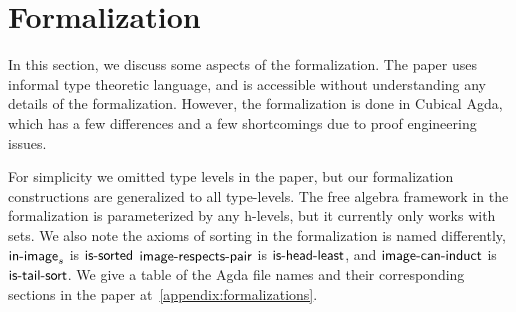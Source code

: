 \section{Formalization}
\label{sec:formalization}

In this section, we discuss some aspects of the formalization.
The paper uses informal type theoretic language,
and is accessible without understanding any details of the formalization.
However, the formalization is done in Cubical Agda, which has a few differences and a few
shortcomings due to proof engineering issues.

For simplicity we omitted type levels in the paper, but our formalization constructions
are generalized to all type-levels.
The free algebra framework in the formalization is
parameterized by any h-levels, but it currently only works with sets.
We also note the axioms of sorting in the formalization is named differently,
$\operatorname{\mathsf{in-image}}_s$ is $\operatorname{\mathsf{is-sorted}}$
$\operatorname{\mathsf{image-respects-pair}}$ is $\operatorname{\mathsf{is-head-least}}$, and
$\operatorname{\mathsf{image-can-induct}}$ is $\operatorname{\mathsf{is-tail-sort}}$.
We give a table of the Agda file names and their corresponding sections in the paper
at~\cref{appendix:formalizations}.

